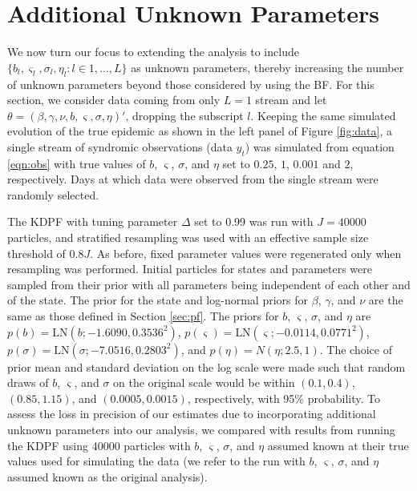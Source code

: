 \documentclass{elsarticle}
\begin{document}
\section{Additional Unknown Parameters \label{sec:extend}}

We now turn our focus to extending the analysis to include $\{b_l,\varsigma_l,\sigma_l,\eta_l:l\in1,\ldots,L\}$ as unknown parameters, thereby increasing the number of unknown parameters beyond those considered by \citet{skvortsov2012monitoring} using the BF. For this section, we consider data coming from only $L = 1$ stream and let $\theta = (\beta, \gamma, \nu, b, \varsigma, \sigma, \eta)'$, dropping the subscript $l$. Keeping the same simulated evolution of the true epidemic as shown in the left panel of Figure \ref{fig:data}, a single stream of syndromic observations (data $y_t$) was simulated from equation \eqref{eqn:obs} with true values of $b$, $\varsigma$, $\sigma$, and $\eta$ set to $0.25$, $1$, $0.001$ and $2$, respectively. Days at which data were observed from the single stream were randomly selected.

The KDPF with tuning parameter $\Delta$ set to 0.99 was run with $J = 40000$ particles, and stratified resampling was used with an effective sample size threshold of $0.8J$. As before, fixed parameter values were regenerated only when resampling was performed. Initial particles for states and parameters were sampled from their prior with all parameters being independent of each other and of the state. The prior for the state and log-normal priors for $\beta$, $\gamma$, and $\nu$ are the same as those defined in Section \ref{sec:pf}. The priors for $b$, $\varsigma$, $\sigma$, and $\eta$ are \hbox{$p(b) = \mbox{LN}(b; -1.6090, 0.3536^2)$}, \hbox{$p(\varsigma) = \mbox{LN}(\varsigma; -0.0114, 0.0771^2)$}, \hbox{$p(\sigma) = \mbox{LN}(\sigma; -7.0516, 0.2803^2)$}, and \hbox{$p(\eta) = N(\eta; 2.5, 1)$}. The choice of prior mean and standard deviation on the log scale were made such that random draws of $b$, $\varsigma$, and $\sigma$ on the original scale would be within $(0.1, 0.4)$, $(0.85, 1.15)$, and $(0.0005, 0.0015)$, respectively, with 95\% probability. To assess the loss in precision of our estimates due to incorporating additional unknown parameters into our analysis, we compared with results from running the KDPF using 40000 particles with $b$, $\varsigma$, $\sigma$, and $\eta$ assumed known at their true values used for simulating the data (we refer to the run with $b$, $\varsigma$, $\sigma$, and $\eta$ assumed known as the original analysis).
\end{document}
